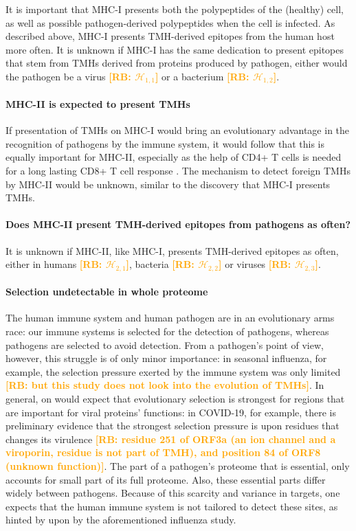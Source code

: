 \documentclass{article}
\newcommand{\richel}[1]{\textcolor{orange}{\textbf{[RB: #1]}}}
\begin{document}
It is important that MHC-I presents both the polypeptides of the 
(healthy) cell, as well as possible pathogen-derived polypeptides when the
cell is infected. As described above, MHC-I presents TMH-derived epitopes 
from the human host more often. It is unknown if MHC-I has the same
dedication to present epitopes that stem from TMHs derived from
proteins produced by pathogen, either would the pathogen
be a virus \richel{$\mathcal{H}_{1,1}$} or 
a bacterium \richel{$\mathcal{H}_{1,2}$}.


\paragraph{MHC-II is expected to present TMHs}


If presentation of TMHs on MHC-I would bring an evolutionary advantage 
in the recognition of pathogens by the immune system, 
it would follow that this is equally important for MHC-II, 
especially as the help of CD4+ T cells is needed for a long lasting CD8+ T cell 
response \cite{novy2007cd4}. 
The mechanism to detect foreign TMHs by MHC-II would be unknown, 
similar to the discovery that MHC-I presents TMHs.

\paragraph{Does MHC-II present TMH-derived epitopes from pathogens as often?}

It is unknown if MHC-II, like MHC-I, 
presents TMH-derived epitopes as often, either 
in humans \richel{$\mathcal{H}_{2,1}$},
bacteria \richel{$\mathcal{H}_{2,2}$}
or viruses \richel{$\mathcal{H}_{2,3}$}.

\paragraph{Selection undetectable in whole proteome}

The human immune system and human pathogen are in an evolutionary
arms race: our immune systems is selected for the detection
of pathogens, whereas pathogens are selected to avoid detection.
From a pathogen's point of view, however, this struggle 
is of only minor importance:
in seasonal influenza, for example, the selection pressure
exerted by the immune system was only limited \cite{han2019individual}
\richel{but this study does not look into the evolution of TMHs}.
In general, on would expect that evolutionary selection is strongest 
for regions that are important for viral proteins' functions:
in COVID-19, for example, there is preliminary evidence that the strongest
selection pressure is upon residues that changes its virulence \cite{velazquez2020positive}
\richel{residue 251 of ORF3a (an ion channel and a 
viroporin, residue is not part of TMH), and position 84 of ORF8 (unknown function)}.
The part of a pathogen's proteome that is essential, 
only accounts for small part of its full proteome.
Also, these essential parts differ widely between pathogens.
Because of this scarcity and variance in targets, 
one expects that the human immune system
is not tailored to detect these sites, 
as hinted by upon by the aforementioned influenza study.
\end{document}
